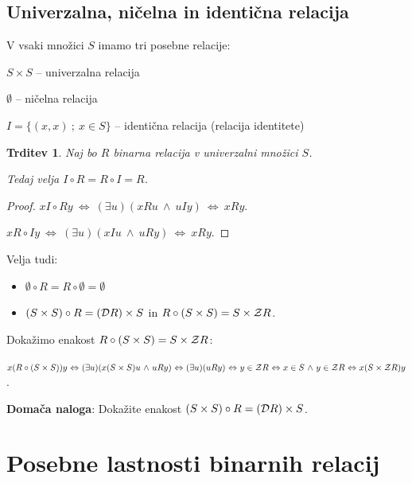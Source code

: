 \documentclass[11pt,paper=b5,DIV=13,headinclude,footinclude]{scrbook}
\def\inn {{~\wedge~}}
\def\cee {{~\Leftrightarrow~}}
\newtheorem*{trditev}{Trditev}
\begin{document}

\subsection{Univerzalna, ničelna in identična relacija}

V vsaki množici $S$ imamo tri posebne relacije:

$S\times S$ -- univerzalna relacija

$\emptyset$ -- ničelna relacija

$I = \{(x,x)~;~x\in S\}$ -- identična relacija (relacija identitete)

\begin{trditev}
Naj bo $R$ binarna relacija v univerzalni množici $S$.

Tedaj velja $I\circ R = R\circ I = R$.
\end{trditev}

\begin{proof}
$xI\circ Ry \cee (\exists u)(xRu \inn uIy) \cee xRy$.

$xR\circ Iy \cee (\exists u)(xIu \inn uRy) \cee xRy$.
\end{proof}

\medskip
Velja tudi:

\begin{itemize}
  \item $\emptyset \circ R = R\circ \emptyset = \emptyset$
  \item $(S\times S)\circ R =
({\cal D}R) \times S$ in $R\circ (S\times S) = S\times {\cal Z}R$.
\end{itemize}

Dokažimo enakost $R\circ (S\times S) = S\times {\cal Z}R$:

$x(R\circ (S\times S))y \cee (\exists u)(x(S\times S)u \inn uRy)
\cee (\exists u)(uRy) \cee y\in {\cal Z}R \cee x\in S\inn y\in {\cal Z}R  \cee x(S\times {\cal Z}R)y$.

\bigskip

\textbf{ Domača naloga}: Dokažite enakost
$(S\times S)\circ R = ({\cal D}R) \times S$.


\section{Posebne lastnosti binarnih relacij}
\end{document}
